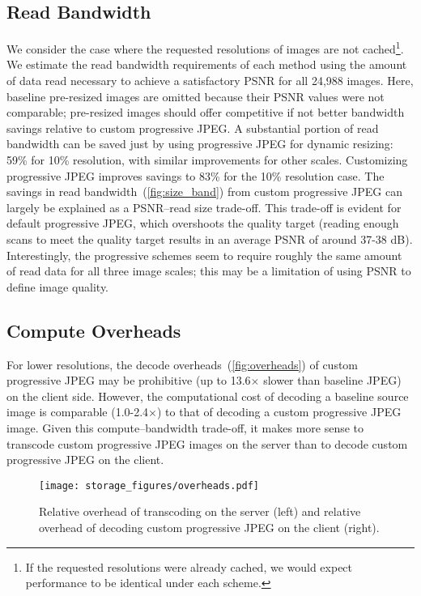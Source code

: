 \subsection{Read Bandwidth}
We consider the case where the requested resolutions of images are not cached\footnote{If the requested resolutions were already cached, we would expect performance to be identical under each scheme.}.
We estimate the read bandwidth requirements of each method using the amount of data read necessary to achieve a satisfactory PSNR for all 24,988 images.
Here, baseline pre-resized images are omitted because their PSNR values were not comparable; pre-resized images should offer competitive if not better bandwidth savings relative to custom progressive JPEG\@.
A substantial portion of read bandwidth can be saved just by using progressive JPEG for dynamic resizing: 59\% for 10\% resolution, with similar improvements for other scales.
Customizing progressive JPEG improves savings to 83\% for the 10\% resolution case.
The savings in read bandwidth~(\autoref{fig:size_band}) from custom progressive JPEG can largely be explained as a PSNR--read size trade-off.
This trade-off is evident for default progressive JPEG, which overshoots the quality target (reading enough scans to meet the quality target results in an average PSNR of around 37-38 dB).
Interestingly, the progressive schemes seem to require roughly the same amount of read data for all three image scales; this may be a limitation of using PSNR to define image quality.

\subsection{Compute Overheads}
For lower resolutions, the decode overheads~(\autoref{fig:overheads}) of custom progressive JPEG may be prohibitive (up to 13.6$\times$ slower than baseline JPEG) on the client side.
However, the computational cost of decoding a baseline source image is comparable (1.0-2.4$\times$) to that of decoding a custom progressive JPEG image.
Given this compute--bandwidth trade-off, it makes more sense to transcode custom progressive JPEG images on the server than to decode custom progressive JPEG on the client.
\begin{figure}[tb]
\texttt{[image: storage\_figures/overheads.pdf]}
\caption{Relative overhead of transcoding on the server (left) and relative overhead of decoding custom progressive JPEG on the client (right).}
\label{fig:overheads}
\end{figure}
